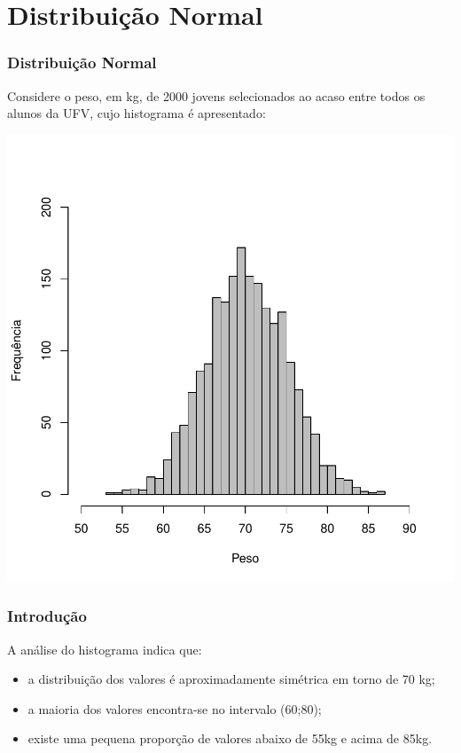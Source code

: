 \documentclass[14pt,aspectratio=1610]{beamer}
\begin{document}
\section{Distribuição Normal}
\begin{frame}[fragile]{}
\frametitle{Distribuição Normal}
Considere o peso, em kg, de 2000 jovens selecionados ao acaso entre todos os alunos da UFV, cujo histograma é apresentado:
\vspace{-1cm}
\begin{center}
\includegraphics{Aula11-001}
\end{center}
\end{frame}

\begin{frame}{}
\frametitle{Introdução}
\begin{block}{}
\justifying
A análise do histograma indica que:
\begin{itemize}
\item a distribuição dos valores é aproximadamente simétrica em torno de 70 kg;
\item a maioria dos valores encontra-se no intervalo (60;80);
\item existe uma pequena proporção de valores abaixo de 55kg e acima de 85kg.
\end{itemize}
\end{block}
\end{frame}
\end{document}

